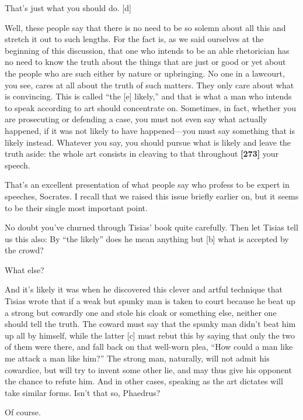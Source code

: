 \sayphaedrus That's just what you should do. {[}d{]}

\saysocrates Well, these people say that there is no need to be so solemn
about all this and stretch it out to such lengths. For the fact is, as
we said ourselves at the beginning of this
discussion, that one
who intends to be an able rhetorician has no need to know the truth
about the things that are just or good or yet about the people who are
such either by nature or upbringing. No one in a lawcourt, you see,
cares at all about the truth of such matters. They only care about what
is convincing. This is called “the {[}e{]} likely,” and that is what a
man who intends to speak according to art should concentrate on.
Sometimes, in fact, whether you are prosecuting or defending a case, you
must not even say what actually happened, if it was not likely to have
happened---you must say something that is likely instead. Whatever you
say, you should pursue what is likely and leave the truth aside: the
whole art consists in cleaving to that throughout {\bf {[}273{]}} your
speech.

\sayphaedrus That's an excellent presentation of what people say who
profess to be expert in speeches, Socrates. I recall that we raised this
issue briefly earlier on, but it seems to be their single most important
point.

\saysocrates No doubt you've churned through Tisias' book quite carefully.
Then let Tisias tell us this also: By “the likely” does he mean anything
but {[}b{]} what is accepted by the crowd?

\sayphaedrus What else?

\saysocrates And it's likely it was when he discovered this clever and
artful technique that Tisias wrote that if a weak but spunky man is
taken to court because he beat up a strong but cowardly one and stole
his cloak or something else, neither one should tell the truth. The
coward must say that the spunky man didn't beat him up all by himself,
while the latter {[}c{]} must rebut this by saying that only the two of
them were there, and fall back on that well-worn plea, “How could a man
like me attack a man like him?” The strong man, naturally, will not
admit his cowardice, but will try to invent some other lie, and may thus
give his opponent the chance to refute him. And in other cases, speaking
as the art dictates will take similar forms. Isn't that so, Phaedrus?

\sayphaedrus Of course.

